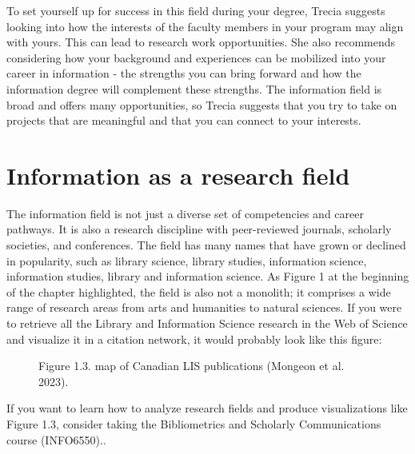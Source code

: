 \documentclass[
  letterpaper,
  DIV=11,
  numbers=noendperiod]{scrreprt}
\makeatletter
\newcommand*\pandocbounded[1]{%
  \sbox\pandoc@box{#1}%
  \Gscale@div\@tempa{\textheight}{\dimexpr\ht\pandoc@box+\dp\pandoc@box\relax}%
  \Gscale@div\@tempb{\linewidth}{\wd\pandoc@box}%
  \ifdim\@tempb\p@<\@tempa\p@\let\@tempa\@tempb\fi%
  \ifdim\@tempa\p@<\p@\scalebox{\@tempa}{\usebox\pandoc@box}%
  \else\usebox{\pandoc@box}%
  \fi%
}
\makeatother
\begin{document}
\begin{tcolorbox}
To set yourself up for success in this field during your degree, Trecia
suggests looking into how the interests of the faculty members in your
program may align with yours. This can lead to research work
opportunities. She also recommends considering how your background and
experiences can be mobilized into your career in information - the
strengths you can bring forward and how the information degree will
complement these strengths. The information field is broad and offers
many opportunities, so Trecia suggests that you try to take on projects
that are meaningful and that you can connect to your interests.

\end{tcolorbox}

\section{Information as a research
field}\label{information-as-a-research-field}

The information field is not just a diverse set of competencies and
career pathways. It is also a research discipline with peer-reviewed
journals, scholarly societies, and conferences. The field has many names
that have grown or declined in popularity, such as library science,
library studies, information science, information studies, library and
information science. As Figure 1 at the beginning of the chapter
highlighted, the field is also not a monolith; it comprises a wide range
of research areas from arts and humanities to natural sciences. If you
were to retrieve all the Library and Information Science research in the
Web of Science and visualize it in a citation network, it would probably
look like this figure:

\begin{figure}[H]

{\centering \pandocbounded{}

}

\caption{Figure 1.3. map of Canadian LIS publications (Mongeon et al.
2023).}

\end{figure}%

\begin{tcolorbox}[enhanced jigsaw, arc=.35mm, bottomrule=.15mm, bottomtitle=1mm, breakable, colback=white, colbacktitle=quarto-callout-note-color!10!white, colframe=quarto-callout-note-color-frame, coltitle=black, left=2mm, leftrule=.75mm, opacityback=0, opacitybacktitle=0.6, rightrule=.15mm, title=\textcolor{quarto-callout-note-color}{\faInfo}\hspace{0.5em}{Did you know?}, titlerule=0mm, toprule=.15mm, toptitle=1mm]

If you want to learn how to analyze research fields and produce
visualizations like Figure 1.3, consider taking the Bibliometrics and
Scholarly Communications course (INFO6550)..

\end{tcolorbox}
\end{document}
